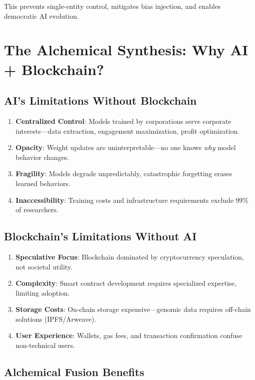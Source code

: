 \documentclass[twocolumn,11pt]{article}
\begin{document}
This prevents single-entity control, mitigates bias injection, and enables democratic AI evolution.

\section{The Alchemical Synthesis: Why AI + Blockchain?}

\subsection{AI's Limitations Without Blockchain}

\begin{enumerate}
    \item \textbf{Centralized Control}: Models trained by corporations serve corporate interests—data extraction, engagement maximization, profit optimization.
    \item \textbf{Opacity}: Weight updates are uninterpretable—no one knows \textit{why} model behavior changes.
    \item \textbf{Fragility}: Models degrade unpredictably, catastrophic forgetting erases learned behaviors.
    \item \textbf{Inaccessibility}: Training costs and infrastructure requirements exclude 99\% of researchers.
\end{enumerate}

\subsection{Blockchain's Limitations Without AI}

\begin{enumerate}
    \item \textbf{Speculative Focus}: Blockchain dominated by cryptocurrency speculation, not societal utility.
    \item \textbf{Complexity}: Smart contract development requires specialized expertise, limiting adoption.
    \item \textbf{Storage Costs}: On-chain storage expensive—genomic data requires off-chain solutions (IPFS/Arweave).
    \item \textbf{User Experience}: Wallets, gas fees, and transaction confirmation confuse non-technical users.
\end{enumerate}

\subsection{Alchemical Fusion Benefits}
\end{document}
